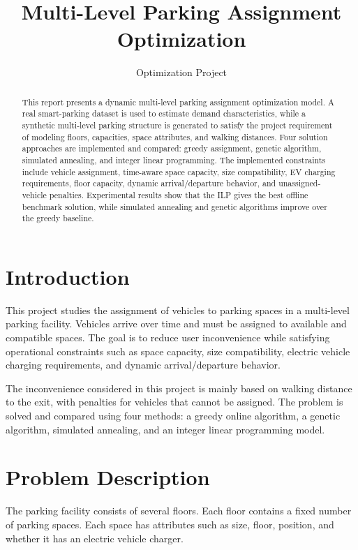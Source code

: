 \documentclass[12pt,a4paper]{article}
\title{\textbf{Multi-Level Parking Assignment Optimization}}
\author{Optimization Project}
\date{}
\begin{document}
\maketitle

\begin{abstract}
This report presents a dynamic multi-level parking assignment optimization model. A real smart-parking dataset is used to estimate demand characteristics, while a synthetic multi-level parking structure is generated to satisfy the project requirement of modeling floors, capacities, space attributes, and walking distances. Four solution approaches are implemented and compared: greedy assignment, genetic algorithm, simulated annealing, and integer linear programming. The implemented constraints include vehicle assignment, time-aware space capacity, size compatibility, EV charging requirements, floor capacity, dynamic arrival/departure behavior, and unassigned-vehicle penalties. Experimental results show that the ILP gives the best offline benchmark solution, while simulated annealing and genetic algorithms improve over the greedy baseline.
\end{abstract}

\section{Introduction}

This project studies the assignment of vehicles to parking spaces in a multi-level parking facility. Vehicles arrive over time and must be assigned to available and compatible spaces. The goal is to reduce user inconvenience while satisfying operational constraints such as space capacity, size compatibility, electric vehicle charging requirements, and dynamic arrival/departure behavior.

The inconvenience considered in this project is mainly based on walking distance to the exit, with penalties for vehicles that cannot be assigned. The problem is solved and compared using four methods: a greedy online algorithm, a genetic algorithm, simulated annealing, and an integer linear programming model.

\section{Problem Description}

The parking facility consists of several floors. Each floor contains a fixed number of parking spaces. Each space has attributes such as size, floor, position, and whether it has an electric vehicle charger.
\end{document}
